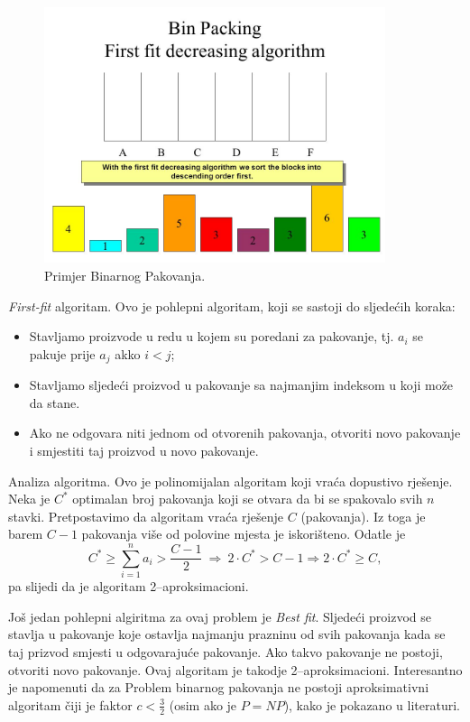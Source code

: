 \documentclass[a4paper, utf8, 11pt, colorlinks]{book}
\begin{document}
\begin{figure}
	\centering
	\includegraphics[width=100mm]{bin-packing}
	\caption{Primjer Binarnog Pakovanja.}
    \label{fig:bin-packing}
\end{figure}
 \emph{First-fit} algoritam. Ovo je pohlepni algoritam, koji se sastoji do sljedećih koraka:
\begin{itemize}
	\item Stavljamo proizvode u redu u kojem su poredani za pakovanje, tj. $a_i$ se pakuje prije $a_j$ akko $i < j$;
	\item Stavljamo sljedeći proizvod u pakovanje sa najmanjim indeksom u koji može da stane. \item Ako ne odgovara niti jednom od otvorenih pakovanja, otvoriti novo pakovanje i smjestiti taj proizvod u novo pakovanje.
\end{itemize}


\noindent Analiza algoritma. Ovo je polinomijalan algoritam koji vraća dopustivo rješenje.  Neka je $C^*$ optimalan broj pakovanja koji se otvara da bi se spakovalo svih $n$ stavki. Pretpostavimo da algoritam vraća rješenje $C$ (pakovanja). Iz toga je barem $C-1$ pakovanja više od polovine mjesta je iskorišteno. Odatle je
$$C^* \geq \sum_{i=1}^n a_i > \frac{C-1}{2}\ \Rightarrow\  2 \cdot C^* > C-1 \Rightarrow 2 \cdot C^* \geq C,$$
pa slijedi da je algoritam 2--aproksimacioni. 

 Još jedan pohlepni algiritma za ovaj problem je \emph{Best fit}. Sljedeći proizvod se stavlja u pakovanje koje ostavlja najmanju prazninu od svih pakovanja kada se taj prizvod smjesti u odgovarajuće pakovanje. Ako takvo pakovanje ne postoji, otvoriti novo pakovanje. 
Ovaj algoritam je takodje 2--aproksimacioni. Interesantno je napomenuti da za Problem binarnog pakovanja ne postoji aproksimativni algoritam čiji je faktor $c <\frac{3}{2}$ (osim ako je $P=NP$), kako je pokazano u literaturi. 
\end{document}
